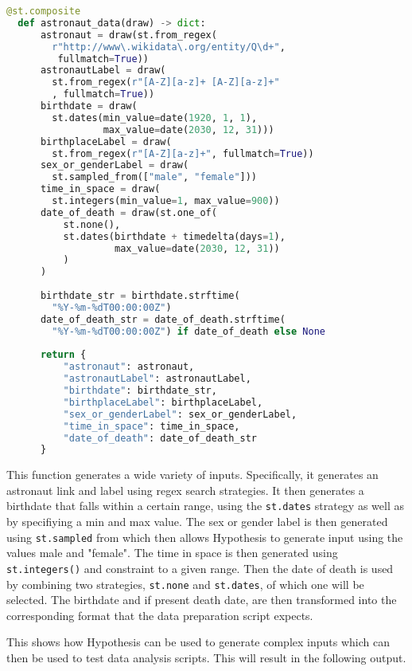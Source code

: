 \documentclass[runningheads]{llncs}
\begin{document}
\begin{lstlisting}[language=Python]
  @st.composite
  def astronaut_data(draw) -> dict:
      astronaut = draw(st.from_regex(
        r"http://www\.wikidata\.org/entity/Q\d+",
         fullmatch=True))
      astronautLabel = draw(
        st.from_regex(r"[A-Z][a-z]+ [A-Z][a-z]+"
        , fullmatch=True))
      birthdate = draw(
        st.dates(min_value=date(1920, 1, 1), 
                 max_value=date(2030, 12, 31)))
      birthplaceLabel = draw(
        st.from_regex(r"[A-Z][a-z]+", fullmatch=True))
      sex_or_genderLabel = draw(
        st.sampled_from(["male", "female"]))
      time_in_space = draw(
        st.integers(min_value=1, max_value=900)) 
      date_of_death = draw(st.one_of(
          st.none(), 
          st.dates(birthdate + timedelta(days=1), 
                   max_value=date(2030, 12, 31))
          )
      )
  
      birthdate_str = birthdate.strftime(
        "%Y-%m-%dT00:00:00Z")
      date_of_death_str = date_of_death.strftime(
        "%Y-%m-%dT00:00:00Z") if date_of_death else None
  
      return {
          "astronaut": astronaut,
          "astronautLabel": astronautLabel,
          "birthdate": birthdate_str,
          "birthplaceLabel": birthplaceLabel,
          "sex_or_genderLabel": sex_or_genderLabel,
          "time_in_space": time_in_space,
          "date_of_death": date_of_death_str
      }
\end{lstlisting}

This function generates a wide variety of inputs. Specifically, it generates an astronaut link and label using regex search strategies. It then generates a birthdate that falls within a certain range, using the \texttt{st.dates} strategy as well as by specifiying a min and max value. The sex or gender label is then generated using \texttt{st.sampled} from which then allows Hypothesis to generate input using the values male and "female". The time in space is then generated using \texttt{st.integers()} and constraint to a given range. Then the date of death is used by combining two strategies, \texttt{st.none} and \texttt{st.dates}, of which one will be selected. The birthdate and if present death date, are then transformed into the corresponding format that the data preparation script expects.

This shows how Hypothesis can be used to generate complex inputs which can then be used to test data analysis scripts. This will result in the following output.
\end{document}

